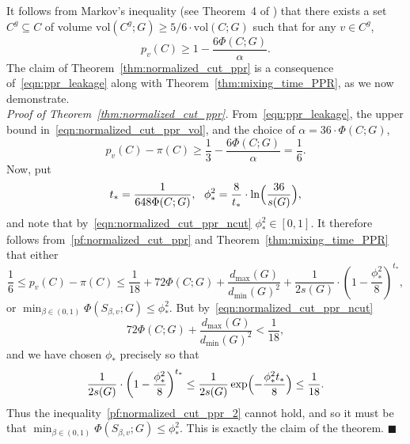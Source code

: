 \documentclass[twoside,11pt]{article}
\newcommand{\1}{\mathbf{1}}
\newcommand{\vol}{\mathrm{vol}}
\newcommand{\qed}{\hfill $\blacksquare$}
\begin{document}
It follows from Markov's inequality (see Theorem~4 of \cite{andersen2006}) that there exists a set $C^g \subseteq C$ of volume $\vol(C^g;G) \geq 5/6 \cdot \vol(C;G)$ such that for any $v \in C^g$,
\begin{equation}
\label{eqn:ppr_leakage}
p_v(C) \geq 1 - \frac{6\Phi(C;G)}{\alpha}.
\end{equation}
The claim of Theorem~\ref{thm:normalized_cut_ppr} is a consequence of~\eqref{eqn:ppr_leakage} along with Theorem~\ref{thm:mixing_time_PPR}, as we now demonstrate. \\

\noindent \emph{Proof of Theorem~\ref{thm:normalized_cut_ppr}.}
From~\eqref{eqn:ppr_leakage}, the upper bound in~\eqref{eqn:normalized_cut_ppr_vol}, and the choice of $\alpha = 36 \cdot \Phi(C;G)$, 
\begin{equation}
\label{pf:normalized_cut_ppr}
p_v(C) - \pi(C) \geq \frac{1}{3} - \frac{6 \Phi(C;G)}{\alpha} = \frac{1}{6}.
\end{equation}
Now, put 
\begin{equation*}
t_{\ast} = \frac{1}{648 \Phi(C;G)},~~\phi_{\ast}^2 = \frac{8}{t_{\ast}} \cdot \ln\Bigl(\frac{36}{s(G)}\Bigr),
\end{equation*}
and note that by~\eqref{eqn:normalized_cut_ppr_ncut} $\phi_{\ast}^2 \in [0,1]$. It therefore follows from~\eqref{pf:normalized_cut_ppr} and Theorem~\ref{thm:mixing_time_PPR} that either
\begin{equation}
\label{pf:normalized_cut_ppr_2}
\frac{1}{6} \leq p_v(C) - \pi(C) \leq \frac{1}{18} + 72 \Phi(C;G) + \frac{d_{\max}(G)}{d_{\min}(G)^2} + \frac{1}{2s(G)} \cdot \left(1 - \frac{\phi_{\ast}^2}{8}\right)^{t_{\ast}},
\end{equation}
or $\min_{\beta \in (0,1)} \Phi(S_{\beta,v};G) \leq \phi_{\ast}^2$. But by~\eqref{eqn:normalized_cut_ppr_ncut}
\begin{equation*}
72 \Phi(C;G) + \frac{d_{\max}(G)}{d_{\min}(G)^2} < \frac{1}{18},
\end{equation*}
and we have chosen $\phi_{\ast}$ precisely so that
\begin{equation*}
\frac{1}{2s(G)} \cdot \left(1 - \frac{\phi_{\ast}^2}{8}\right)^{t_{\ast}} \leq \frac{1}{2s(G)} \exp\Bigl(-\frac{\phi_{\ast}^2 t_{\ast}}{8}\Bigr) \leq \frac{1}{18}.
\end{equation*}
Thus the inequality~\eqref{pf:normalized_cut_ppr_2} cannot hold, and so it must be that $\min_{\beta \in (0,1)} \Phi(S_{\beta,v};G) \leq \phi_{\ast}^2$. This is exactly the claim of the theorem. \qed
\end{document}
